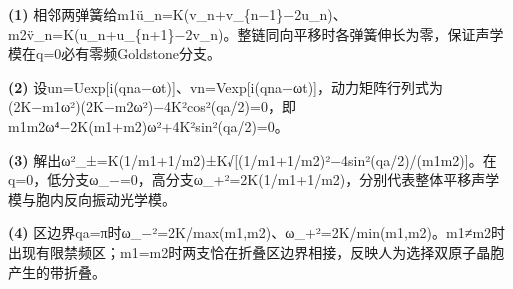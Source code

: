 \par\noindent\textbf{(1)} 相邻两弹簧给m1ü\_n=K(v\_n+v\_\{n−1\}−2u\_n)、m2v̈\_n=K(u\_n+u\_\{n+1\}−2v\_n)。整链同向平移时各弹簧伸长为零，保证声学模在q=0必有零频Goldstone分支。
\par\noindent\textbf{(2)} 设un=Uexp[i(qna−ωt)]、vn=Vexp[i(qna−ωt)]，动力矩阵行列式为(2K−m1ω²)(2K−m2ω²)−4K²cos²(qa/2)=0，即m1m2ω⁴−2K(m1+m2)ω²+4K²sin²(qa/2)=0。
\par\noindent\textbf{(3)} 解出ω²\_±=K(1/m1+1/m2)±K√[(1/m1+1/m2)²−4sin²(qa/2)/(m1m2)]。在q=0，低分支ω\_−=0，高分支ω\_+²=2K(1/m1+1/m2)，分别代表整体平移声学模与胞内反向振动光学模。
\par\noindent\textbf{(4)} 区边界qa=π时ω\_−²=2K/max(m1,m2)、ω\_+²=2K/min(m1,m2)。m1≠m2时出现有限禁频区；m1=m2时两支恰在折叠区边界相接，反映人为选择双原子晶胞产生的带折叠。
